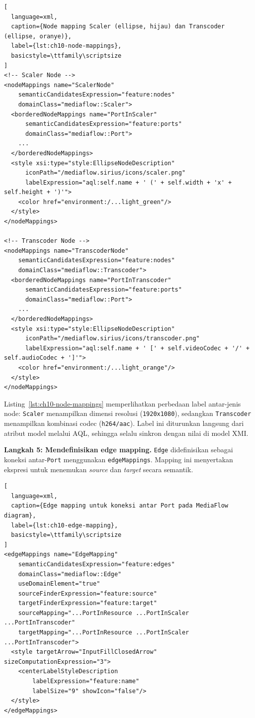 \begin{lstlisting}[
  language=xml,
  caption={Node mapping Scaler (ellipse, hijau) dan Transcoder (ellipse, oranye)},
  label={lst:ch10-node-mappings},
  basicstyle=\ttfamily\scriptsize
]
<!-- Scaler Node -->
<nodeMappings name="ScalerNode"
    semanticCandidatesExpression="feature:nodes"
    domainClass="mediaflow::Scaler">
  <borderedNodeMappings name="PortInScaler"
      semanticCandidatesExpression="feature:ports"
      domainClass="mediaflow::Port">
    ...
  </borderedNodeMappings>
  <style xsi:type="style:EllipseNodeDescription"
      iconPath="/mediaflow.sirius/icons/scaler.png"
      labelExpression="aql:self.name + ' (' + self.width + 'x' + self.height + ')'">
    <color href="environment:/...light_green"/>
  </style>
</nodeMappings>

<!-- Transcoder Node -->
<nodeMappings name="TranscoderNode"
    semanticCandidatesExpression="feature:nodes"
    domainClass="mediaflow::Transcoder">
  <borderedNodeMappings name="PortInTranscoder"
      semanticCandidatesExpression="feature:ports"
      domainClass="mediaflow::Port">
    ...
  </borderedNodeMappings>
  <style xsi:type="style:EllipseNodeDescription"
      iconPath="/mediaflow.sirius/icons/transcoder.png"
      labelExpression="aql:self.name + ' [' + self.videoCodec + '/' + self.audioCodec + ']'">
    <color href="environment:/...light_orange"/>
  </style>
</nodeMappings>
\end{lstlisting}

\noindent Listing~\ref{lst:ch10-node-mappings} memperlihatkan perbedaan label antar-jenis node: \texttt{Scaler} menampilkan dimensi resolusi (\texttt{1920x1080}), sedangkan \texttt{Transcoder} menampilkan kombinasi codec (\texttt{h264/aac}). Label ini diturunkan langsung dari atribut model melalui AQL, sehingga selalu sinkron dengan nilai di model XMI.

\textbf{Langkah 5: Mendefinisikan edge mapping.} \texttt{Edge} didefinisikan sebagai koneksi antar-\texttt{Port} menggunakan \texttt{edgeMappings}. Mapping ini menyertakan ekspresi untuk menemukan \textit{source} dan \textit{target} secara semantik.

\begin{lstlisting}[
  language=xml,
  caption={Edge mapping untuk koneksi antar Port pada MediaFlow diagram},
  label={lst:ch10-edge-mapping},
  basicstyle=\ttfamily\scriptsize
]
<edgeMappings name="EdgeMapping"
    semanticCandidatesExpression="feature:edges"
    domainClass="mediaflow::Edge"
    useDomainElement="true"
    sourceFinderExpression="feature:source"
    targetFinderExpression="feature:target"
    sourceMapping="...PortInResource ...PortInScaler ...PortInTranscoder"
    targetMapping="...PortInResource ...PortInScaler ...PortInTranscoder">
  <style targetArrow="InputFillClosedArrow" sizeComputationExpression="3">
    <centerLabelStyleDescription
        labelExpression="feature:name"
        labelSize="9" showIcon="false"/>
  </style>
</edgeMappings>
\end{lstlisting}

